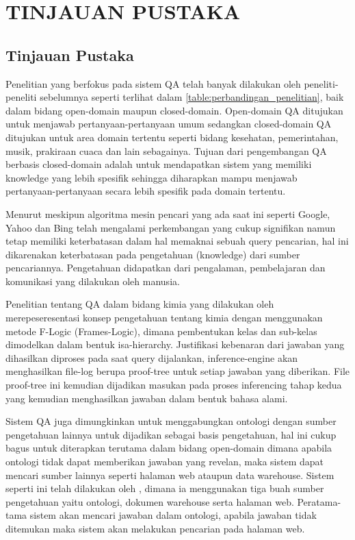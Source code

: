\chapter{TINJAUAN PUSTAKA}
\section{Tinjauan Pustaka}
Penelitian yang berfokus pada sistem QA telah banyak dilakukan oleh peneliti-peneliti sebelumnya seperti terlihat dalam \ref{table:perbandingan_penelitian}, baik dalam bidang open-domain maupun closed-domain. Open-domain QA ditujukan untuk menjawab pertanyaan-pertanyaan umum sedangkan closed-domain QA ditujukan untuk area domain tertentu seperti bidang kesehatan, pemerintahan, musik, prakiraan cuaca dan lain sebagainya. Tujuan dari pengembangan QA berbasis closed-domain adalah untuk mendapatkan sistem yang memiliki knowledge yang lebih spesifik sehingga diharapkan mampu menjawab pertanyaan-pertanyaan secara lebih spesifik pada domain tertentu.

Menurut \citet{zadeh} meskipun algoritma mesin pencari yang ada saat ini seperti Google, Yahoo dan Bing telah mengalami perkembangan yang cukup signifikan namun tetap memiliki keterbatasan dalam hal memaknai sebuah query pencarian, hal ini dikarenakan keterbatasan pada pengetahuan (knowledge) dari sumber pencariannya. Pengetahuan didapatkan dari pengalaman, pembelajaran dan komunikasi yang dilakukan oleh manusia.

Penelitian tentang QA dalam bidang kimia yang dilakukan oleh merepeseresentasi konsep pengetahuan tentang kimia dengan menggunakan metode F-Logic (Frames-Logic), dimana pembentukan kelas dan sub-kelas dimodelkan dalam bentuk isa-hierarchy. Justifikasi kebenaran dari jawaban yang dihasilkan diproses pada saat query dijalankan, inference-engine akan menghasilkan file-log berupa proof-tree untuk setiap jawaban yang diberikan. File proof-tree ini kemudian dijadikan masukan pada proses inferencing tahap kedua yang kemudian menghasilkan jawaban dalam bentuk bahasa alami.

Sistem QA juga dimungkinkan untuk menggabungkan ontologi dengan sumber pengetahuan lainnya untuk dijadikan sebagai basis pengetahuan, hal ini cukup bagus untuk diterapkan terutama dalam bidang open-domain dimana apabila ontologi tidak dapat memberikan jawaban yang revelan, maka sistem dapat mencari sumber lainnya seperti halaman web ataupun data warehouse. Sistem seperti ini telah dilakukan oleh \citet*{guo_zhang}, dimana ia menggunakan tiga buah sumber pengetahuan yaitu ontologi, dokumen warehouse serta halaman web. Peratama-tama sistem akan mencari jawaban dalam ontologi, apabila jawaban tidak ditemukan maka sistem akan melakukan pencarian pada halaman web.

